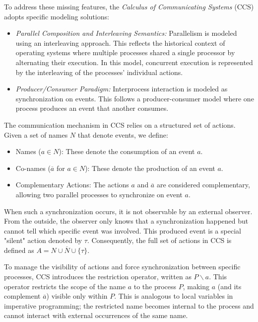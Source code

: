 To address these missing features, the \textit{Calculus of Communicating Systems} (CCS) adopts specific modeling solutions:
\begin{itemize}
    \item \textit{Parallel Composition and Interleaving Semantics:} Parallelism is modeled using an interleaving approach. This reflects the historical context of operating systems where multiple processes shared a single processor by alternating their execution. In this model, concurrent execution is represented by the interleaving of the processes' individual actions.
    \item \textit{Producer/Consumer Paradigm:} Interprocess interaction is modeled as synchronization on events. This follows a producer-consumer model where one process produces an event that another consumes.
\end{itemize}

The communication mechanism in CCS relies on a structured set of actions. Given a set of names $N$ that denote events, we define:
\begin{itemize}
    \item Names ($a\in N$): These denote the consumption of an event $a$.
    \item Co-names ($\overline{a}$ for $a\in N$): These denote the production of an event $a$.
    \item Complementary Actions: The actions $a$ and $\overline{a}$ are considered complementary, allowing two parallel processes to synchronize on event $a$.
\end{itemize}
    
When such a synchronization occurs, it is not observable by an external observer. From the outside, the observer only knows that a synchronization happened but cannot tell which specific event was involved. This produced event is a special "silent" action denoted by $\tau$. Consequently, the full set of actions in CCS is defined as $A=N\cup \overline{N}\cup\{\tau\}$.

To manage the visibility of actions and force synchronization between specific processes, CCS introduces the restriction operator, written as $P\backslash a$. This operator restricts the scope of the name $a$ to the process $P$, making $a$ (and its complement $\overline{a}$) visible only within $P$. This is analogous to local variables in imperative programming; the restricted name becomes internal to the process and cannot interact with external occurrences of the same name.

